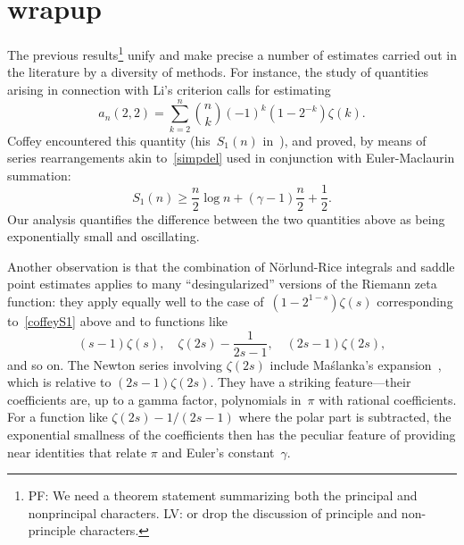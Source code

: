\documentclass{amsart}
\begin{document}
\section{wrapup}
\smallskip
The previous results\footnote{%
	PF: We need a theorem statement summarizing both the principal and nonprincipal
	characters. LV: or drop the discussion of principle and non-principle characters.}
unify and make precise a number of estimates carried out in the literature by a diversity
of methods. For instance, the study of quantities arising in connection with Li's criterion
calls for estimating
\begin{equation}\label{coffeyS1}
a_n(2,2)=\sum_{k=2}^n \binom{n}{k}(-1)^k(1-2^{-k})\zeta(k).
\end{equation}
Coffey encountered this quantity (his~$S_1(n)$ in~\cite{Coffey05}),
and proved, by means of series rearrangements akin to~\eqref{simpdel}
used in conjunction with Euler-Maclaurin summation:
\begin{equation}\label{coffeyineq}
S_1(n)\ge \frac{n}{2}\log n+(\gamma-1)\frac{n}{2}+\frac12.
\end{equation}
Our analysis quantifies  the difference between the two quantities above as
being exponentially small and oscillating.

Another observation is that the combination of N\"orlund-Rice integrals
and saddle point estimates applies to many ``desingularized'' versions of 
the Riemann zeta function: they apply equally well to
the case of~$(1-2^{1-s})\zeta(s)$ corresponding to~\eqref{coffeyS1} above
and to functions like
\[
(s-1)\zeta(s), \quad
\zeta(2s)-\frac{1}{2s-1},\quad
(2s-1)\zeta(2s),
\]
and so on. The 
Newton series involving $\zeta(2s)$ include Ma{\'s}lanka's expansion~\cite{Maslanka01}, which is
relative to $(2s-1)\zeta(2s)$.
They have a striking feature---their coefficients are, up to a gamma factor,
polynomials in~$\pi$ with rational coefficients. 
For a function like $\zeta(2s)-1/(2s-1)$ where the polar part is subtracted,
the exponential smallness of the coefficients
then has the peculiar feature of providing near identities that relate $\pi$ and
Euler's constant~$\gamma$.








\end{document}
